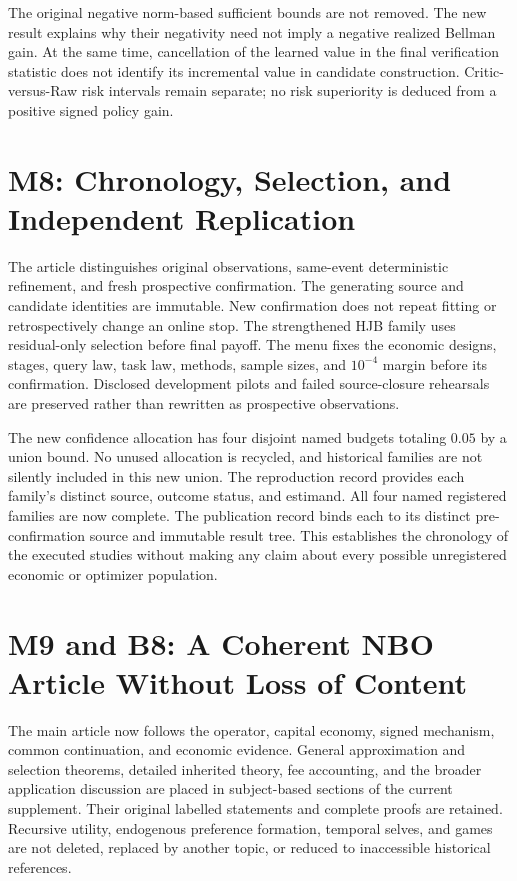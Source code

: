 The original negative norm-based sufficient bounds are not removed. The new result explains why their negativity need not imply a negative realized Bellman gain. At the same time, cancellation of the learned value in the final verification statistic does not identify its incremental value in candidate construction. Critic-versus-Raw risk intervals remain separate; no risk superiority is deduced from a positive signed policy gain.

\section{M8: Chronology, Selection, and Independent Replication}
The article distinguishes original observations, same-event deterministic refinement, and fresh prospective confirmation. The generating source and candidate identities are immutable. New confirmation does not repeat fitting or retrospectively change an online stop. The strengthened HJB family uses residual-only selection before final payoff. The menu fixes the economic designs, stages, query law, task law, methods, sample sizes, and $10^{-4}$ margin before its confirmation. Disclosed development pilots and failed source-closure rehearsals are preserved rather than rewritten as prospective observations.

The new confidence allocation has four disjoint named budgets totaling $0.05$ by a union bound. No unused allocation is recycled, and historical families are not silently included in this new union. The reproduction record provides each family's distinct source, outcome status, and estimand. All four named registered families are now complete. The publication record binds each to its distinct pre-confirmation source and immutable result tree. This establishes the chronology of the executed studies without making any claim about every possible unregistered economic or optimizer population.

\section{M9 and B8: A Coherent NBO Article Without Loss of Content}
The main article now follows the operator, capital economy, signed mechanism, common continuation, and economic evidence. General approximation and selection theorems, detailed inherited theory, fee accounting, and the broader application discussion are placed in subject-based sections of the current supplement. Their original labelled statements and complete proofs are retained. Recursive utility, endogenous preference formation, temporal selves, and games are not deleted, replaced by another topic, or reduced to inaccessible historical references.

